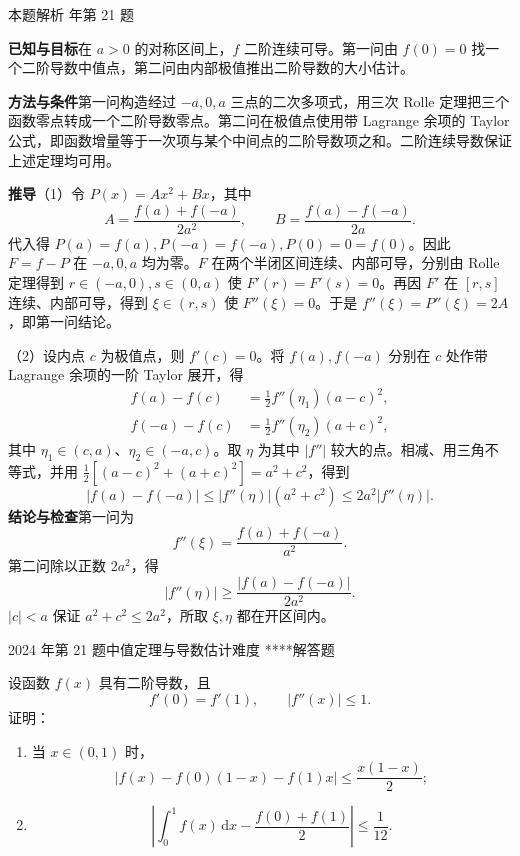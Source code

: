\documentclass[UTF8,zihao=-4,fontset=fandol]{ctexart}
\newcounter{BankQuestion}
\newcommand{\QuestionPage}[7]{%
  \stepcounter{BankQuestion}%
  \par\noindent\begin{minipage}{\linewidth}
  \raggedright
  {\small\textcolor{black!60}{#3\quad #5\quad 难度 #7}\hfill\textcolor{accent}{#2}}\par\smallskip}
\newcommand{\QuestionEnd}{\end{minipage}\par\medskip}
\newcommand{\QuestionPage}[7]{%
  \clearpage
  \stepcounter{BankQuestion}%
  {\small\textcolor{accent}{#1\hfill #2}}\par\medskip
  {\small\textcolor{black!60}{#3\quad #5\quad 难度 #7\hfill \arabic{BankQuestion} / 234}}\par\vspace{9bp}}
\newcommand{\QuestionEnd}{}
\newenvironment{QuestionSolution}[1]{%
  \clearpage
  {\small\textcolor{black!60}{本题解析\quad #1}}\par\medskip
}{\par\clearpage}
\begin{document}
\begin{QuestionSolution}{2023 年第 21 题}
\textbf{已知与目标}\quad 在 \(a>0\) 的对称区间上，\(f\) 二阶连续可导。第一问由 \(f(0)=0\) 找一个二阶导数中值点，第二问由内部极值推出二阶导数的大小估计。

\textbf{方法与条件}\quad 第一问构造经过 \(-a,0,a\) 三点的二次多项式，用三次 Rolle 定理把三个函数零点转成一个二阶导数零点。第二问在极值点使用带 Lagrange 余项的 Taylor 公式，即函数增量等于一次项与某个中间点的二阶导数项之和。二阶连续导数保证上述定理均可用。

\textbf{推导}\quad （1）令 \(P(x)=Ax^2+Bx\)，其中
\[
A=\frac{f(a)+f(-a)}{2a^2},\qquad
B=\frac{f(a)-f(-a)}{2a}.
\]
代入得 \(P(a)=f(a),P(-a)=f(-a),P(0)=0=f(0)\)。因此 \(F=f-P\) 在 \(-a,0,a\) 均为零。\(F\) 在两个半闭区间连续、内部可导，分别由 Rolle 定理得到 \(r\in(-a,0),s\in(0,a)\) 使 \(F'(r)=F'(s)=0\)。再因 \(F'\) 在 \([r,s]\) 连续、内部可导，得到 \(\xi\in(r,s)\) 使 \(F''(\xi)=0\)。于是 \(f''(\xi)=P''(\xi)=2A\)，即第一问结论。

（2）设内点 \(c\) 为极值点，则 \(f'(c)=0\)。将 \(f(a),f(-a)\) 分别在 \(c\) 处作带 Lagrange 余项的一阶 Taylor 展开，得
\[
\begin{aligned}
f(a)-f(c)&=\frac{1}{2}f''(\eta_1)(a-c)^2,\\
f(-a)-f(c)&=\frac{1}{2}f''(\eta_2)(a+c)^2,
\end{aligned}
\]
其中 \(\eta_1\in(c,a)\)、\(\eta_2\in(-a,c)\)。取 \(\eta\) 为其中 \(|f''|\) 较大的点。相减、用三角不等式，并用 \(\frac12[(a-c)^2+(a+c)^2]=a^2+c^2\)，得到
\[
|f(a)-f(-a)|\le |f''(\eta)|(a^2+c^2)
\le 2a^2|f''(\eta)|.
\]
\textbf{结论与检查}\quad 第一问为
\[\boxed{f''(\xi)=\frac{f(a)+f(-a)}{a^2}}.\]
第二问除以正数 \(2a^2\)，得
\[\boxed{|f''(\eta)|\ge\frac{|f(a)-f(-a)|}{2a^2}}.\]
\(|c|<a\) 保证 \(a^2+c^2\le2a^2\)，所取 \(\xi,\eta\) 都在开区间内。
\end{QuestionSolution}

\QuestionPage{2.4 微分中值定理及其应用}{解答题}{2024 年第 21 题}{3}{中值定理与导数估计}{095 / 234}{****}
设函数 \(f(x)\) 具有二阶导数，且
\[f'(0)=f'(1),\qquad |f''(x)|\le 1.
\]
证明：
\begin{enumerate}
\item 当 \(x\in(0,1)\) 时，
\[\left|f(x)-f(0)(1-x)-f(1)x\right|\le \frac{x(1-x)}{2};
\]
\item \[\left|\int_0^1 f(x)\,\mathrm{d}x-\frac{f(0)+f(1)}{2}\right|\le \frac{1}{12}.
\]
\end{enumerate}
\QuestionEnd
\end{document}
